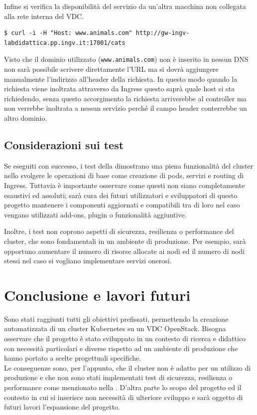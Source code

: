 \documentclass[12pt,a4paper,openright,twoside]{book}
\begin{document}
Infine si verifica la disponibilità del servizio da un'altra macchina non collegata alla rete interna del VDC. 
\begin{lstlisting}
$ curl -i -H "Host: www.animals.com" http://gw-ingv-labdidattica.pp.ingv.it:17001/cats
\end{lstlisting}
Visto che il dominio utilizzato (\texttt{www.animals.com}) non è inserito in nessun DNS non sarà possibile scrivere direttamente l'URL ma si dovrà aggiungere manualmente
l'indirizzo all'header della richiesta. In questo modo quando la richiesta viene inoltrata attraverso da Ingress questo saprà quale host si sta richiedendo,
senza questo accorgimento la richiesta arriverebbe al controller ma non verrebbe inoltrata a nessun servizio perché il campo header conterrebbe un altro dominio. 

\section{Considerazioni sui test}
\label{sec:test-concl}
Se eseguiti con successo, i test della  dimostrano una piena funzionalità del cluster nello svolgere le operazioni di base come creazione di pods, servizi e routing di Ingress.
Tuttavia è importante osservare come questi non siano completamente esaustivi ed assoluti; sarà cura dei futuri utilizzatori e sviluppatori di questo progetto mantenere i componenti aggiornati e compatibili tra
di loro nel caso vengano utilizzati add-ons, plugin o funzionalità aggiuntive.

Inoltre, i test non coprono aspetti di sicurezza, resilienza o performance del cluster, che sono fondamentali in un ambiente di produzione. Per esempio, sarà opportuno 
aumentare il numero di risorse allocate ai nodi ed il numero di nodi stessi nel caso si vogliano implementare servizi onerosi. 
%
\chapter{Conclusione e lavori futuri}
Sono stati raggiunti tutti gli obiettivi prefissati, permettendo la creazione automatizzata di un cluster Kubernetes su un VDC OpenStack.
Bisogna osservare che il progetto è stato sviluppato in un contesto di ricerca e didattico con necessità particolari e diverse rispetto ad 
un ambiente di produzione che hanno portato a scelte progettuali specifiche.\\
Le conseguenze sono, per l'appunto, che il cluster non è adatto per un utilizzo di produzione e che non sono stati implementati test di sicurezza, resilienza o performance
come menzionato nella .
D'altra parte lo scopo del progetto ed il contesto in cui si inserisce non necessità di ulteriore sviluppo e sarà oggetto di futuri lavori l'espansione del progetto.
\end{document}
